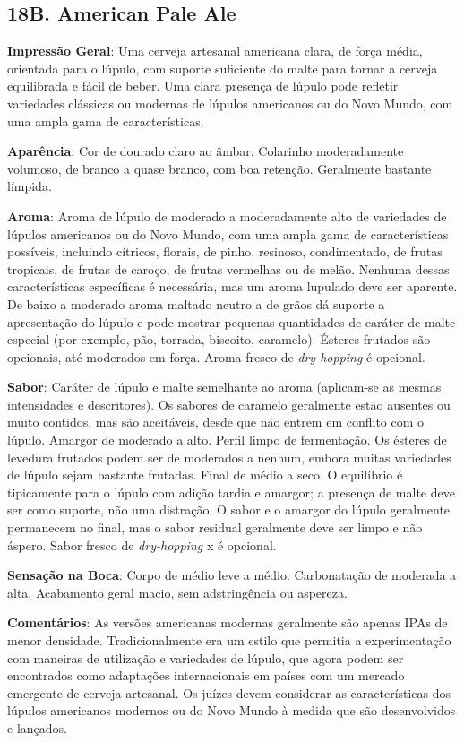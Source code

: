 \subsection*{18B. American Pale Ale}
\textbf{Impressão Geral}: Uma cerveja artesanal americana clara, de força média, orientada para o lúpulo, com suporte suficiente do malte para tornar a cerveja equilibrada e fácil de beber. Uma clara presença de lúpulo pode refletir variedades clássicas ou modernas de lúpulos americanos ou do Novo Mundo, com uma ampla gama de características.

\textbf{Aparência}: Cor de dourado claro ao âmbar. Colarinho moderadamente volumoso, de branco a quase branco, com boa retenção. Geralmente bastante límpida.

\textbf{Aroma}: Aroma de lúpulo de moderado a moderadamente alto de variedades de lúpulos americanos ou do Novo Mundo, com uma ampla gama de características possíveis, incluindo cítricos, florais, de pinho, resinoso, condimentado, de frutas tropicais, de frutas de caroço, de frutas vermelhas ou de melão. Nenhuma dessas características específicas é necessária, mas um aroma lupulado deve ser aparente. De baixo a moderado aroma maltado neutro a de grãos dá suporte a apresentação do lúpulo e pode mostrar pequenas quantidades de caráter de malte especial (por exemplo, pão, torrada, biscoito, caramelo). Ésteres frutados são opcionais, até moderados em força. Aroma fresco de \textit{dry-hopping} é opcional.

\textbf{Sabor}: Caráter de lúpulo e malte semelhante ao aroma (aplicam-se as mesmas intensidades e descritores). Os sabores de caramelo geralmente estão ausentes ou muito contidos, mas são aceitáveis, desde que não entrem em conflito com o lúpulo. Amargor de moderado a alto. Perfil limpo de fermentação. Os ésteres de levedura frutados podem ser de moderados a nenhum, embora muitas variedades de lúpulo sejam bastante frutadas. Final de médio a seco. O equilíbrio é tipicamente para o lúpulo com adição tardia e amargor; a presença de malte deve ser como suporte, não uma distração. O sabor e o amargor do lúpulo geralmente permanecem no final, mas o sabor residual geralmente deve ser limpo e não áspero. Sabor fresco de \textit{dry-hopping} x  é opcional.

\textbf{Sensação na Boca}: Corpo de médio leve a médio. Carbonatação de moderada a alta. Acabamento geral macio, sem adstringência ou aspereza.

\textbf{Comentários}: As versões americanas modernas geralmente são apenas IPAs de menor densidade. Tradicionalmente era um estilo que permitia a experimentação com maneiras de utilização e variedades de lúpulo, que agora podem ser encontrados como adaptações internacionais em países com um mercado emergente de cerveja artesanal. Os juízes devem considerar as características dos lúpulos americanos modernos ou do Novo Mundo à medida que são desenvolvidos e lançados.

